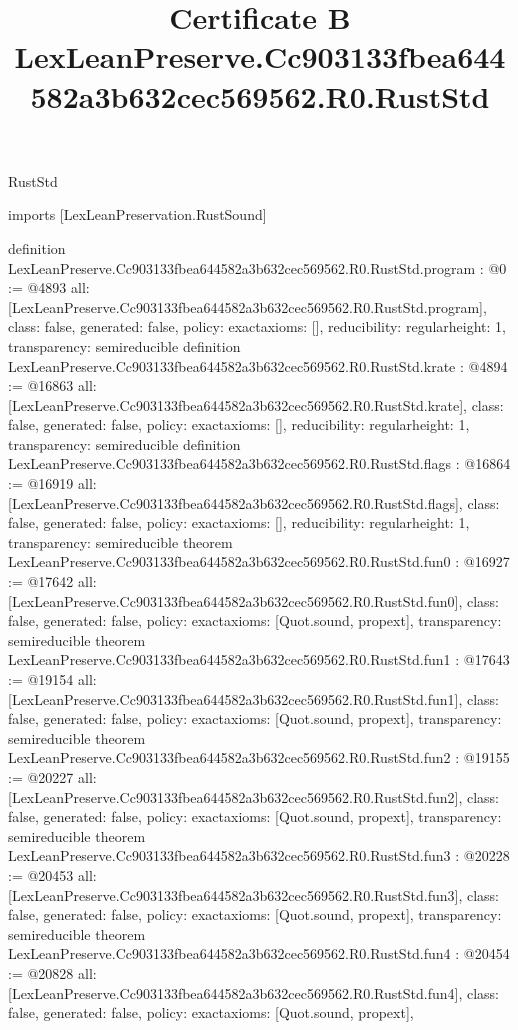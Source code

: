 \begin{lexlean}{RustStd}
\title{Certificate B LexLeanPreserve.Cc903133fbea644582a3b632cec569562.R0.RustStd}
\begin{coremodule}
imports [LexLeanPreservation.RustSound]

definition LexLeanPreserve.Cc903133fbea644582a3b632cec569562.R0.RustStd.program : @0 := @4893 {
  all: [LexLeanPreserve.Cc903133fbea644582a3b632cec569562.R0.RustStd.program],
  class: false,
  generated: false,
  policy: exact{axioms: []},
  reducibility: regular{height: 1},
  transparency: semireducible
}
definition LexLeanPreserve.Cc903133fbea644582a3b632cec569562.R0.RustStd.krate : @4894 := @16863 {
  all: [LexLeanPreserve.Cc903133fbea644582a3b632cec569562.R0.RustStd.krate],
  class: false,
  generated: false,
  policy: exact{axioms: []},
  reducibility: regular{height: 1},
  transparency: semireducible
}
definition LexLeanPreserve.Cc903133fbea644582a3b632cec569562.R0.RustStd.flags : @16864 := @16919 {
  all: [LexLeanPreserve.Cc903133fbea644582a3b632cec569562.R0.RustStd.flags],
  class: false,
  generated: false,
  policy: exact{axioms: []},
  reducibility: regular{height: 1},
  transparency: semireducible
}
theorem LexLeanPreserve.Cc903133fbea644582a3b632cec569562.R0.RustStd.fun0 : @16927 := @17642 {
  all: [LexLeanPreserve.Cc903133fbea644582a3b632cec569562.R0.RustStd.fun0],
  class: false,
  generated: false,
  policy: exact{axioms: [Quot.sound, propext]},
  transparency: semireducible
}
theorem LexLeanPreserve.Cc903133fbea644582a3b632cec569562.R0.RustStd.fun1 : @17643 := @19154 {
  all: [LexLeanPreserve.Cc903133fbea644582a3b632cec569562.R0.RustStd.fun1],
  class: false,
  generated: false,
  policy: exact{axioms: [Quot.sound, propext]},
  transparency: semireducible
}
theorem LexLeanPreserve.Cc903133fbea644582a3b632cec569562.R0.RustStd.fun2 : @19155 := @20227 {
  all: [LexLeanPreserve.Cc903133fbea644582a3b632cec569562.R0.RustStd.fun2],
  class: false,
  generated: false,
  policy: exact{axioms: [Quot.sound, propext]},
  transparency: semireducible
}
theorem LexLeanPreserve.Cc903133fbea644582a3b632cec569562.R0.RustStd.fun3 : @20228 := @20453 {
  all: [LexLeanPreserve.Cc903133fbea644582a3b632cec569562.R0.RustStd.fun3],
  class: false,
  generated: false,
  policy: exact{axioms: [Quot.sound, propext]},
  transparency: semireducible
}
theorem LexLeanPreserve.Cc903133fbea644582a3b632cec569562.R0.RustStd.fun4 : @20454 := @20828 {
  all: [LexLeanPreserve.Cc903133fbea644582a3b632cec569562.R0.RustStd.fun4],
  class: false,
  generated: false,
  policy: exact{axioms: [Quot.sound, propext]},
}
\end{coremodule}
\end{lexlean}
